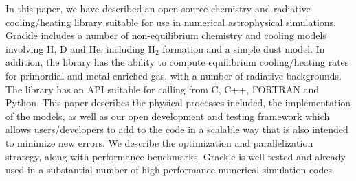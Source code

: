 In this paper, we have described an open-source chemistry and
radiative cooling/heating library suitable for use in numerical
astrophysical simulations.  Grackle includes a number of
non-equilibrium chemistry and cooling models involving H, D and He,
including H$_2$ formation and a simple dust model.  In addition, the
library has the ability to compute equilibrium cooling/heating rates
for primordial and metal-enriched gas, with a number of radiative
backgrounds.  The library has an API suitable for calling from C, C++,
FORTRAN and Python.  This paper describes the physical processes
included, the implementation of the models, as well as our open
development and testing framework which allows users/developers to add
to the code in a scalable way that is also intended to minimize new
errors.  We describe the optimization and parallelization strategy,
along with performance benchmarks.  Grackle is well-tested and already
used in a substantial number of high-performance numerical simulation
codes.



